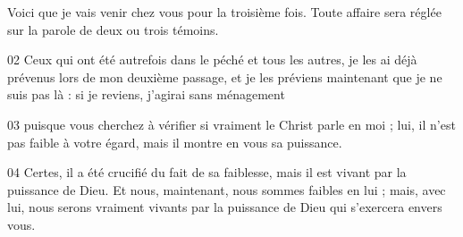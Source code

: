 Voici que je vais venir chez vous pour la troisième fois. Toute affaire sera réglée sur la parole de deux ou trois témoins.

02 Ceux qui ont été autrefois dans le péché et tous les autres, je les ai déjà prévenus lors de mon deuxième passage, et je les préviens maintenant que je ne suis pas là : si je reviens, j’agirai sans ménagement

03 puisque vous cherchez à vérifier si vraiment le Christ parle en moi ; lui, il n’est pas faible à votre égard, mais il montre en vous sa puissance.

04 Certes, il a été crucifié du fait de sa faiblesse, mais il est vivant par la puissance de Dieu. Et nous, maintenant, nous sommes faibles en lui ; mais, avec lui, nous serons vraiment vivants par la puissance de Dieu qui s’exercera envers vous.
